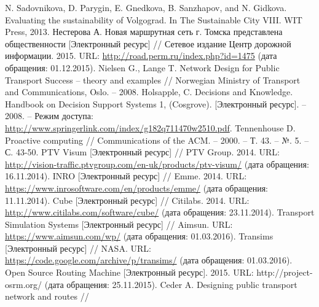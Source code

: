 \renewcommand{\bibname}{%
    \vspace{-2em}\begin{center}
        Список используемой литературы
    \end{center}\vspace{-2em}
}

\pagestyle{empty}

\begin{thebibliography}{10}
     N. Sadovnikova, D. Parygin, E. Gnedkova, B. Sanzhapov, and N. Gidkova. 
        Evaluating the sustainability of Volgograd. In The Sustainable City VIII. WIT Press, 2013.
     Нестерова А. Новая маршрутная сеть г. Томска представлена общественности 
        [Электронный ресурс] // Сетевое издание Центр дорожной информации. 2015. URL: 
        \url{http://road.perm.ru/index.php?id=1475} (дата обращения: 01.12.2015).
     Nielsen G., Lange T. Network Design for Public Transport Success -- theory and 
        examples // Norwegian Ministry of Transport and Communications, Oslo. -- 2008.
     Holsapple, C. Decisions and Knowledge. Handbook on Decision Support Systems 1, 
        (Cosgrove). [Электронный ресурс]. -- 2008. -- Режим доступа: 
        \url{http://www.springerlink.com/index/g182q711470w2510.pdf}.
     Tennenhouse D. Proactive computing //
        Communications of the ACM. -- 2000. -- Т. 43. -- №. 5. -- С. 43-50.
     PTV Visum [Электронный ресурс] // PTV Group. 2014. URL: 
        \url{http://vision-traffic.ptvgroup.com/en-uk/products/ptv-visum/} 
        (дата обращения: 16.11.2014).
     INRO [Электронный ресурс] // Emme. 2014. URL: 
        \url{https://www.inrosoftware.com/en/products/emme/} (дата обращения: 11.11.2014).
     Cube [Электронный ресурс] // Citilabs. 2014. URL: 
        \url{http://www.citilabs.com/software/cube/} (дата обращения: 23.11.2014).
     Transport Simulation Systems [Электронный ресурс] // Aimsun. URL: 
        \url{https://www.aimsun.com/wp/} (дата обращения: 01.03.2016).
     Transims [Электронный ресурс] // NASA. URL: 
        \url{https://code.google.com/archive/p/transims/} (дата обращения: 01.03.2016).
     Open Source Routing Machine [Электронный ресурс]. 2015. URL: http://project-osrm.org/ 
        (дата обращения: 25.11.2015).
     Ceder A. Designing public transport network and routes //

\end{thebibliography}

